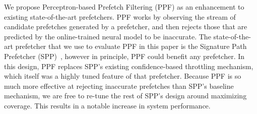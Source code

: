 

We propose Perceptron-based Prefetch Filtering (PPF) as an enhancement to
existing state-of-the-art prefetchers. PPF works by observing the stream of
candidate prefetches generated by a prefetcher, and then rejects those that
are predicted by the online-trained neural model to be inaccurate.
The state-of-the-art prefetcher that we 
use to evaluate PPF in this paper is the Signature Path Prefetcher 
(SPP)~\cite{SPP}, however in principle, PPF could benefit any prefetcher.
In this design, PPF replaces SPP's existing confidence-based throttling mechanism,
which itself was a highly tuned feature of that prefetcher. Because PPF is
so much more effective at rejecting inaccurate prefetches than SPP's baseline
mechanism, we are free to re-tune the rest of SPP's design around maximizing
coverage. This results in a notable increase in system performance.

